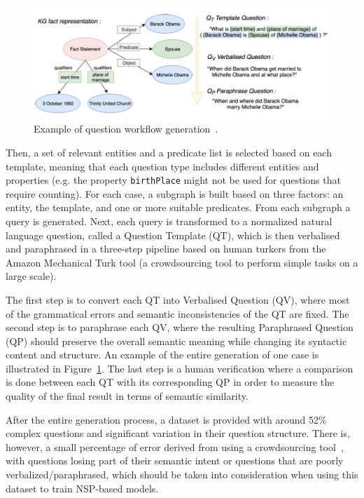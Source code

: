 \begin{figure}[!h]
    \centering
    \includegraphics[scale=.55]{imagenes/2_theorical_framework/question_answering/lcquad2Workflow.PNG}
    \caption{Example of \LCQuADtwo{} question workflow generation~\cite{dataset:lcquad2-DubeyBA019}.}
    \label{fig:lcquad2Pipeline}
\end{figure}

Then, a set of relevant entities and a predicate list is selected based on each \SPARQL{} template, 
meaning that each question type includes different entities and properties (e.g. the property 
\texttt{birthPlace} might not be used for questions that require counting). For each case, a 
subgraph is built based on three factors: an entity, the \SPARQL{} template, and one or more 
suitable predicates. From each subgraph a \SPARQL{} query is generated. Next, each \SPARQL{} query is 
transformed to a normalized natural language question, called a Question Template (QT), which is 
then verbalised and paraphrased in a three-step pipeline based on human turkers from the Amazon 
Mechanical Turk tool (a crowdsourcing tool to perform simple tasks on a large scale). 

The first step is to convert each QT into Verbalised Question (QV), where most of the 
grammatical errors and semantic inconsistencies of the QT are fixed. The second step is to 
paraphrase each QV, where the resulting Paraphrased Question (QP) should preserve the overall 
semantic meaning while changing its syntactic content and structure. An example of the entire 
generation of one case is illustrated in Figure~\ref{fig:lcquad2Pipeline}. The last step is a 
human verification where a comparison is done between each QT with its corresponding QP in 
order to measure the quality of the final result in terms of semantic similarity.

After the entire generation process, a dataset is provided with around 52\% complex questions 
and significant variation in their  question structure. There is, however, a small percentage 
of error derived from using a crowdsourcing tool~\cite{dataset:lcquad2-DubeyBA019}, with questions 
losing part of their semantic intent or questions that are poorly verbalized/paraphrased, which 
should be taken into consideration when using this dataset to train NSP-based models. 
